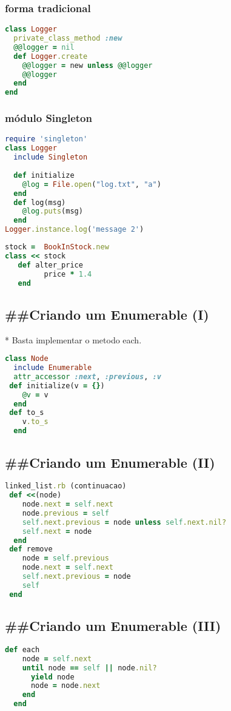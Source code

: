 \documentclass[serif,mathserif]{article}
\begin{document}
\subsubsection{forma tradicional}
\begin{lstlisting}[language=ruby]
class Logger
  private_class_method :new
  @@logger = nil
  def Logger.create
    @@logger = new unless @@logger
    @@logger
  end
end
\end{lstlisting}

\subsubsection{módulo Singleton}
\begin{lstlisting}[language=ruby]
require 'singleton'
class Logger
  include Singleton
  
  def initialize
    @log = File.open("log.txt", "a")
  end
  def log(msg)
    @log.puts(msg)
  end
Logger.instance.log('message 2')
\end{lstlisting}

\begin{lstlisting}[language=ruby]
stock =  BookInStock.new
class << stock
   def alter_price
         price * 1.4
   end
\end{lstlisting}

\subsection{\#\#Criando um Enumerable (I)}
  *  Basta implementar o metodo each. 
\begin{lstlisting}[language=ruby]
class Node
  include Enumerable 
  attr_accessor :next, :previous, :v
 def initialize(v = {})
    @v = v
  end
 def to_s
    v.to_s
  end
\end{lstlisting}

\subsection{\#\#Criando um Enumerable (II)}
\begin{lstlisting}[language=ruby]
linked_list.rb (continuacao)
 def <<(node)
    node.next = self.next
    node.previous = self
    self.next.previous = node unless self.next.nil?
    self.next = node
  end
 def remove
    node = self.previous
    node.next = self.next
    self.next.previous = node
    self
 end
\end{lstlisting}

\subsection{\#\#Criando um Enumerable (III)}
\begin{lstlisting}[language=ruby]
  def each
    node = self.next
    until node == self || node.nil?
      yield node
      node = node.next
    end
  end

\end{lstlisting}
\end{document}
